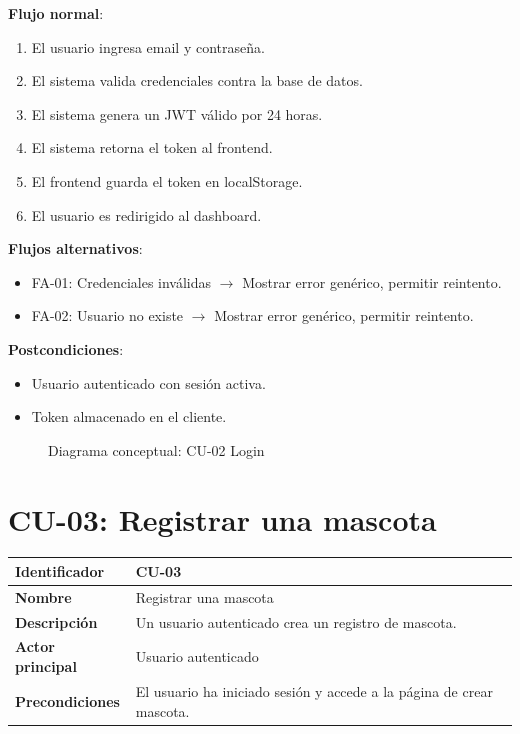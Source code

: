 \documentclass[12pt,a4paper]{article}
\begin{document}
\vspace{0.5em}

\textbf{Flujo normal}:
\begin{enumerate}[leftmargin=*]
    \item El usuario ingresa email y contrase\~na.
    \item El sistema valida credenciales contra la base de datos.
    \item El sistema genera un JWT v\'alido por 24 horas.
    \item El sistema retorna el token al frontend.
    \item El frontend guarda el token en localStorage.
    \item El usuario es redirigido al dashboard.
\end{enumerate}

\textbf{Flujos alternativos}:
\begin{itemize}[leftmargin=*]
    \item FA-01: Credenciales inv\'alidas $\rightarrow$ Mostrar error gen\'erico, permitir reintento.
    \item FA-02: Usuario no existe $\rightarrow$ Mostrar error gen\'erico, permitir reintento.
\end{itemize}

\textbf{Postcondiciones}:
\begin{itemize}[leftmargin=*]
    \item Usuario autenticado con sesi\'on activa.
    \item Token almacenado en el cliente.
\end{itemize}

\begin{figure}[h]
\centering
{}
\caption{Diagrama conceptual: CU-02 Login}
\end{figure}

\newpage

\section{CU-03: Registrar una mascota}

\begin{tabular}{|p{3.5cm}|p{10cm}|}
\hline
\textbf{Identificador} & CU-03 \\
\hline
\textbf{Nombre} & Registrar una mascota \\
\hline
\textbf{Descripci\'on} & Un usuario autenticado crea un registro de mascota. \\
\hline
\textbf{Actor principal} & Usuario autenticado \\
\hline
\textbf{Precondiciones} & El usuario ha iniciado sesi\'on y accede a la p\'agina de crear mascota. \\
\hline
\end{tabular}
\end{document}
